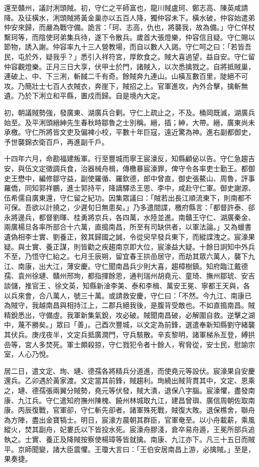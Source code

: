 \begin{pinyinscope}
還至贛州，議討浰頭賊。初，守仁之平師富也，龍川賊盧珂、鄭志高、陳英咸請降。及征橫水，浰頭賊將黃金巢亦以五百人降，獨仲容未下。橫水破，仲容始遣弟仲安來歸，而嚴為戰守備。詭言：「珂、志高，仇也，將襲我，故為備。」守仁佯杖繫珂等，而陰使珂弟集兵待，遂下令散兵。歲首大張燈樂，仲容信且疑。守仁賜以節物，誘入謝。仲容率九十三人營教場，而自以數人入謁。守仁呵之曰：「若皆吾民，屯於外，疑我乎？」悉引入祥符宮，厚飲食之。賊大喜過望，益自安。守仁留仲容觀燈樂。正月三日大享，伏甲士於門，諸賊入，以次悉擒戮之。自將抵賊巢，連破上、中、下三浰，斬馘二千有奇。餘賊奔九連山。山橫亙數百里，陡絕不可攻。乃簡壯士七百人衣賊衣，奔崖下，賊招之上。官軍進攻，內外合擊，擒斬無遺。乃於下浰立和平縣，置戍而歸。自是境內大定。

初，朝議賊勢強，發廣東、湖廣兵合剿。守仁上疏止之，不及。桶岡既滅，湖廣兵始至。及平浰頭縉紳先生春秋時鄒魯之士別稱。縉，插；紳，大帶。縉，廣東尚未承檄。守仁所將皆文吏及偏裨小校，平數十年巨寇，遠近驚為神。進右副都御史，予世襲錦衣衛百戶，再進副千戶。

十四年六月，命勘福建叛軍。行至豐城而寧王宸濠反，知縣顧佖以告。守仁急趨吉安，與伍文定徵調兵食，治器械舟楫，傳檄暴宸濠罪，俾守令各率吏士勤王。都御史王懋中，編修鄒守益，副使羅循、羅欽德，郎中曾直，御史張鰲山、周魯，評事羅僑，同知郭祥鵬，進士郭持平，降謫驛丞王思、李中，咸赴守仁軍。御史謝源、伍希儒自廣東還，守仁留之紀功。因集眾議曰：「賊若出長江順流東下，則南都不可保。吾欲以計撓之，少遲旬日無患矣。」乃多遣間諜，檄府縣言：「都督許泰、郤永將邊兵，都督劉暉、桂勇將京兵，各四萬，水陸並進。南贛王守仁、湖廣秦金、兩廣楊旦各率所部合十六萬，直搗南昌，所至有司缺供者，以軍法論。」又為蠟書遺偽相李士實、劉養正，敘其歸國之誠，令從臾早發兵東下，而縱諜洩之。宸濠果疑。與士實、養正謀，則皆勸之疾趨南京即大位，宸濠益大疑。十餘日詗知中外兵不至，乃悟守仁紿之。七月壬辰朔，留宜春王拱嵒居守，而劫其眾六萬人，襲下九江、南康，出大江，薄安慶。守仁聞南昌兵少則大喜，趨樟樹鎮。知府臨江戴德孺、袁州徐璉、贛州邢珣，都指揮餘恩，通判瑞州胡堯元、童琦、撫州鄒琥、安吉談儲，推官王、徐文英，知縣新淦李美、泰和李楫、萬安王冕、寧都王天與，各以兵來會，合八萬人，號三十萬。或請救安慶，守仁曰：「不然。今九江、南康已為賊守，我越南昌與相持江上，二郡兵絕我後，是腹背受敵也。不如直搗南昌。賊精銳悉出，守備虛。我軍新集氣銳，攻必破。賊聞南昌破，必解圍自救。逆擊之湖中，蔑不勝矣。」眾曰「善」。己酉次豐城，以文定為前鋒，選遣奉新知縣劉守緒襲其伏兵。庚戌夜半，文定兵抵廣潤門，守兵駭散。辛亥黎明，諸軍梯糸亙登，縛拱嵒等，宮人多焚死。軍士頗殺掠，守仁戮犯令者十餘人，宥脅從，安士民，慰諭宗室，人心乃悅。

居二日，遣文定、珣、璉、德孺各將精兵分道進，而使堯元等設伏。宸濠果自安慶還兵。乙卯遇於黃家渡。文定當其前鋒，賊趨利。珣繞出賊背貫其中，文定、恩乘之，璉、德孺張兩翼分賊勢，堯元等伏發，賊大潰，退保八字腦。宸濠懼，盡發南康、九江兵。守仁遣知府撫州陳槐、饒州林城取九江，建昌曾璵、廣信周朝佐取南康。丙辰復戰，官軍卻，守仁斬先卻者。諸軍殊死戰，賊復大敗。退保樵舍，聯舟為方陣，盡出金寶犒士。明日，宸濠方晨朝其群臣，官軍奄至。以小舟載薪，乘風縱火，焚其副舟，妃婁氏以下皆投水死。宸濠舟膠淺，倉卒易舟遁，王冕所部兵追執之。士實、養正及降賊按察使楊璋等皆就擒。南康、九江亦下。凡三十五日而賊平。京師聞變，諸大臣震懼。王瓊大言曰：「王伯安居南昌上游，必擒賊。」至是，果奏捷。


\end{pinyinscope}
